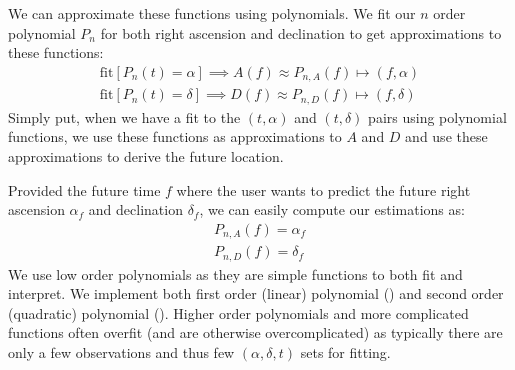 \documentclass[letterpaper,11pt,english]{sphinxmanual}
\begin{document}
\sphinxAtStartPar
We can approximate these functions using polynomials. We fit our \(n\)
order polynomial \(P_n\) for both right ascension and declination to get
approximations to these functions:
\begin{equation*}
\begin{split}\text{fit}[P_n(t) = \alpha] \implies A(f) \approx P_{n,A}(f) \mapsto (f, \alpha) \\
\text{fit}[P_n(t) = \delta] \implies D(f) \approx P_{n,D}(f) \mapsto (f, \delta)\end{split}
\end{equation*}
\sphinxAtStartPar
Simply put, when we have a fit to the \((t, \alpha)\) and
\((t, \delta)\) pairs using polynomial functions, we use these functions as
approximations to \(A\) and \(D\) and use these approximations to
derive the future location.

\sphinxAtStartPar
Provided the future time \(f\) where the user wants to predict the future
right ascension \(\alpha_f\) and declination \(\delta_f\), we can
easily compute our estimations as:
\begin{equation*}
\begin{split}P_{n,A}(f) = \alpha_f \\
P_{n,D}(f) = \delta_f\end{split}
\end{equation*}
\sphinxAtStartPar
We use low order polynomials as they are simple functions to both fit and
interpret. We implement both first order (linear) polynomial
({\hyperref[\detokenize{code/opihiexarata.propagate.polynomial:opihiexarata.propagate.polynomial.LinearPropagationEngine}]{}}) and
second order (quadratic) polynomial
({\hyperref[\detokenize{code/opihiexarata.propagate.polynomial:opihiexarata.propagate.polynomial.QuadraticPropagationEngine}]{}}).
Higher order polynomials and more complicated functions often over\sphinxhyphen{}fit (and
are otherwise overcomplicated) as typically there are only a few observations
and thus few \((\alpha, \delta, t)\) sets for fitting.
\end{document}
